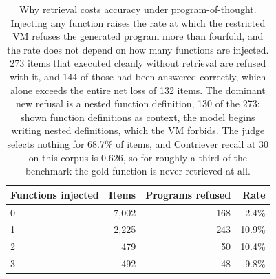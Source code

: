 \begin{table}[t]\centering\small
\begin{tabular}{lrrr}
\toprule
\textbf{Functions injected} & \textbf{Items} & \textbf{Programs refused} & \textbf{Rate} \\
\midrule
0 & 7{,}002 & 168 & 2.4\% \\
1 & 2{,}225 & 243 & 10.9\% \\
2 & 479 & 50 & 10.4\% \\
3 & 492 & 48 & 9.8\% \\
\bottomrule
\end{tabular}
\caption{Why retrieval costs accuracy under program-of-thought. Injecting any function raises
the rate at which the restricted VM refuses the generated program more than fourfold, and the
rate does not depend on how many functions are injected. 273 items that executed cleanly
without retrieval are refused with it, and 144 of those had been answered correctly, which
alone exceeds the entire net loss of 132 items. The dominant new refusal is a nested function
definition, 130 of the 273: shown function definitions as context, the model begins writing
nested definitions, which the VM forbids. The judge selects nothing for 68.7\% of items, and
Contriever recall at 30 on this corpus is 0.626, so for roughly a third of the benchmark the
gold function is never retrieved at all.}
\label{tab:pot-mechanism}
\end{table}
